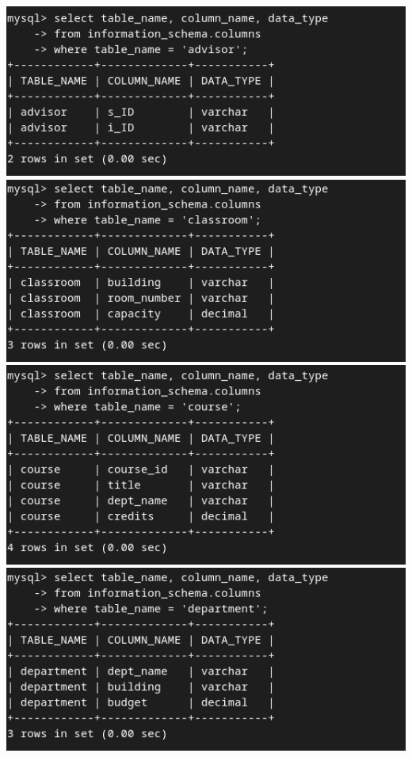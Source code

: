 \documentclass{article}
\begin{document}
\section{}
\begin{center}
    \includegraphics[scale=0.6]{6-1.png}
    \includegraphics[scale=0.6]{6-2.png}
    \includegraphics[scale=0.6]{6-3.png}
    \includegraphics[scale=0.6]{6-4.png}

\end{center}
\end{document}
